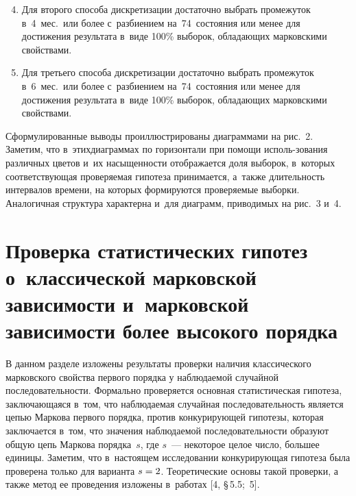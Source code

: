 \begin{multicols}{2}
\vspace*{6pt}

\addtocounter{figure}{1}



\noindent
\begin{enumerate}[1.]
\setcounter{enumi}{3}
\item  Для второго способа дискретизации достаточно выбрать промежуток 
в~4~мес.\ или более с~раз\-би\-ени\-ем на~74~состояния или менее для 
достижения результата в~виде 100\% выборок, обла\-да\-ющих марковскими 
свойствами.
\item Для третьего способа дискретизации достаточно выбрать промежуток 
в~6~мес.\ или более с~раз\-би\-ени\-ем на~74~состояния или менее для 
достижения результата в~виде 100\% выборок, обла\-да\-ющих марковскими 
свойствами.
\end{enumerate}
  
  Сформулированные выводы проиллюстрированы диаграммами на рис.~2.
    Заметим, что в~этих\linebreak диаграммах по горизонтали при помощи исполь-\linebreak зования различных цветов 
    и~их насыщенности отоб\-ра\-жа\-ет\-ся доля выборок, в~которых соответствующая проверяемая гипотеза принимается, 
    а~также длительность интервалов времени, на которых формируются проверяемые выборки. Аналогичная структура характерна 
    и~для диаграмм, приводимых на рис.~3 и~4.

\vspace*{-6pt}

\section{Проверка статистических гипотез о~классической 
марковской зависимости и~марковской зависимости более высокого 
порядка} 

\vspace*{-2pt}
  
  В данном разделе изложены результаты проверки наличия классического 
марковского свойства первого порядка у наблюдаемой случайной 
последовательности. Формально проверяется основная статистическая 
гипотеза, заключающаяся в~том, что наблюдаемая случайная 
последовательность является цепью Маркова первого порядка, против 
конкурирующей гипотезы, которая заключается в~том, что значения 
наблюдаемой последовательности образуют общую цепь Маркова порядка~$s$, 
где $s$~--- некоторое целое число, большее единицы. Заметим, что в~настоящем 
исследовании конкурирующая гипотеза была проверена только для варианта 
$s\hm=2$. Теоретические основы такой проверки, а также метод ее проведения 
изложены в~работах [4, \S\,5.5;~5].
  

\end{multicols}
